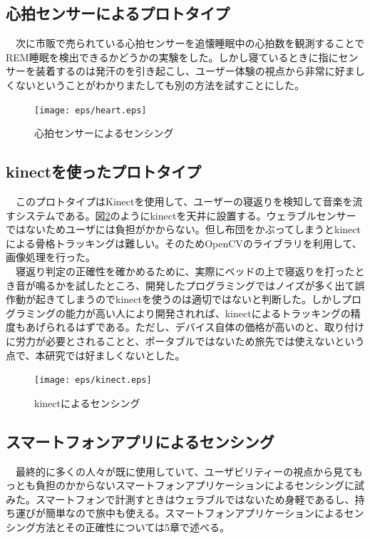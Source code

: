 \subsection{心拍センサーによるプロトタイプ}
　次に市販で売られている心拍センサーを追懐睡眠中の心拍数を観測することでREM睡眠を検出できるかどうかの実験をした。しかし寝ているときに指にセンサーを装着するのは発汗のを引き起こし、ユーザー体験の視点から非常に好ましくないということがわかりまたしても別の方法を試すことにした。

\begin{figure}[htbp]
\begin{center}
\texttt{[image: eps/heart.eps]}
\caption{心拍センサーによるセンシング}
\label{heart}
\end{center}
\end{figure}

\subsection{kinectを使ったプロトタイプ}
　このプロトタイプはKinectを使用して、ユーザーの寝返りを検知して音楽を流すシステムである。図\ref{kinect}のようにkinectを天井に設置する。ウェラブルセンサーではないためユーザには負担がかからない。但し布団をかぶってしまうとkinectによる骨格トラッキングは難しい。そのためOpenCVのライブラリを利用して、画像処理を行った。\\
　寝返り判定の正確性を確かめるために、実際にベッドの上で寝返りを打ったとき音が鳴るかを試したところ、開発したプログラミングではノイズが多く出て誤作動が起きてしまうのでkinectを使うのは適切ではないと判断した。しかしプログラミングの能力が高い人により開発されれば、kinectによるトラッキングの精度もあげられるはずである。ただし、デバイス自体の価格が高いのと、取り付けに労力が必要とされることと、ポータブルではないため旅先では使えないという点で、本研究では好ましくないとした。

\begin{figure}[htbp]
\begin{center}
\texttt{[image: eps/kinect.eps]}
\caption{kinectによるセンシング}
\label{kinect}
\end{center}
\end{figure}

\subsection{スマートフォンアプリによるセンシング}
　最終的に多くの人々が既に使用していて、ユーザビリティーの視点から見てもっとも負担のかからないスマートフォンアプリケーションによるセンシングに試みた。スマートフォンで計測すときはウェラブルではないため身軽であるし、持ち運びが簡単なので旅中も使える。スマートフォンアプリケーションによるセンシング方法とその正確性については5章で述べる。
